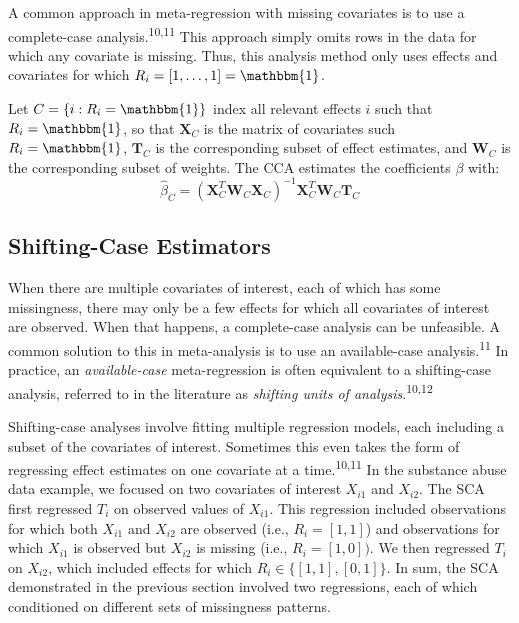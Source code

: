 \documentclass[
]{article}
\begin{document}
A common approach in meta-regression with missing covariates is to use a complete-case analysis.\textsuperscript{10,11}
This approach simply omits rows in the data for which any covariate is missing.
Thus, this analysis method only uses effects and covariates for which \(R_i = [1, \ldots, 1] = \mathbbm{1}\).

Let \(C = \{i : R_i = \mathbbm{1}\}\) index all relevant effects \(i\) such that \(R_i = \mathbbm{1}\), so that \(\mathbf{X}_C\) is the matrix of covariates such \(R_i = \mathbbm{1}\), \(\mathbf{T}_C\) is the corresponding subset of effect estimates, and \(\mathbf{W}_C\) is the corresponding subset of weights.
The CCA estimates the coefficients \(\beta\) with:
\begin{equation}
\hat{\beta}_C
  = (\mathbf{X}_C^T \mathbf{W}_C \mathbf{X}_C)^{-1} \mathbf{X}_C^T \mathbf{W}_C \mathbf{T}_C
\label{eq:beta-c}
\end{equation}

\hypertarget{shifting-case-estimators}{%
\subsection{Shifting-Case Estimators}\label{shifting-case-estimators}}

When there are multiple covariates of interest, each of which has some missingness, there may only be a few effects for which all covariates of interest are observed.
When that happens, a complete-case analysis can be unfeasible.
A common solution to this in meta-analysis is to use an available-case analysis.\textsuperscript{11}
In practice, an \emph{available-case} meta-regression is often equivalent to a shifting-case analysis, referred to in the literature as \emph{shifting units of analysis}.\textsuperscript{10,12}

Shifting-case analyses involve fitting multiple regression models, each including a subset of the covariates of interest.
Sometimes this even takes the form of regressing effect estimates on one covariate at a time.\textsuperscript{10,11}
In the substance abuse data example, we focused on two covariates of interest \(X_{i1}\) and \(X_{i2}\).
The SCA first regressed \(T_i\) on observed values of \(X_{i1}\).
This regression included observations for which both \(X_{i1}\) and \(X_{i2}\) are observed (i.e., \(R_i = [1, 1]\)) and observations for which \(X_{i1}\) is observed but \(X_{i2}\) is missing (i.e., \(R_i = [1, 0])\).
We then regressed \(T_i\) on \(X_{i2}\), which included effects for which \(R_i \in \{[1, 1], [0, 1]\}\).
In sum, the SCA demonstrated in the previous section involved two regressions, each of which conditioned on different sets of missingness patterns.
\end{document}
